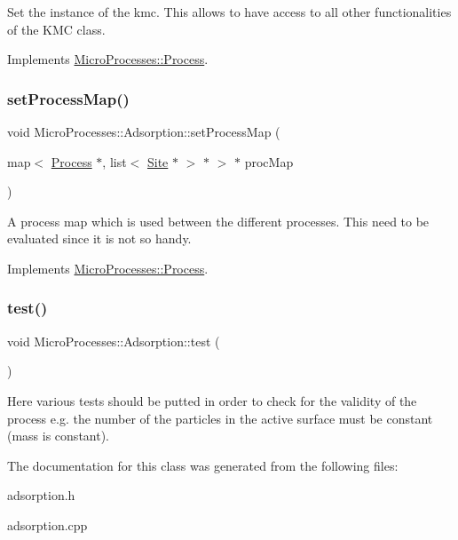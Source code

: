 Set the instance of the kmc. This allows to have access to all other functionalities of the K\+MC class. 

Implements \mbox{\hyperlink{classMicroProcesses_1_1Process_a4c419af2e6e6477200b45bf687783c84}{Micro\+Processes\+::\+Process}}.

\mbox{\label{classMicroProcesses_1_1Adsorption_ab64c4f96f4b1b612db57c90c82140e3b}} 
\subsubsection{\texorpdfstring{set\+Process\+Map()}{setProcessMap()}}
{\footnotesize\ttfamily void Micro\+Processes\+::\+Adsorption\+::set\+Process\+Map (\begin{DoxyParamCaption}\item[{map$<$ \mbox{\hyperlink{classMicroProcesses_1_1Process}{Process}} $\ast$, list$<$ \mbox{\hyperlink{classSurfaceTiles_1_1Site}{Site}} $\ast$ $>$ $\ast$ $>$ $\ast$}]{proc\+Map }\end{DoxyParamCaption})\hspace{0.3cm}{\ttfamily [virtual]}}

A process map which is used between the different processes. This need to be evaluated since it is not so handy. 

Implements \mbox{\hyperlink{classMicroProcesses_1_1Process_a4e726f7491eb805efd9dcd1c0c3a380f}{Micro\+Processes\+::\+Process}}.

\mbox{\label{classMicroProcesses_1_1Adsorption_a891d1db6714ecbe9c3f698febc376652}} 
\subsubsection{\texorpdfstring{test()}{test()}}
{\footnotesize\ttfamily void Micro\+Processes\+::\+Adsorption\+::test (\begin{DoxyParamCaption}{ }\end{DoxyParamCaption})}

Here various tests should be putted in order to check for the validity of the process e.\+g. the number of the particles in the active surface must be constant (mass is constant). 

The documentation for this class was generated from the following files\+:\begin{DoxyCompactItemize}
\item 
adsorption.\+h\item 
adsorption.\+cpp\end{DoxyCompactItemize}
